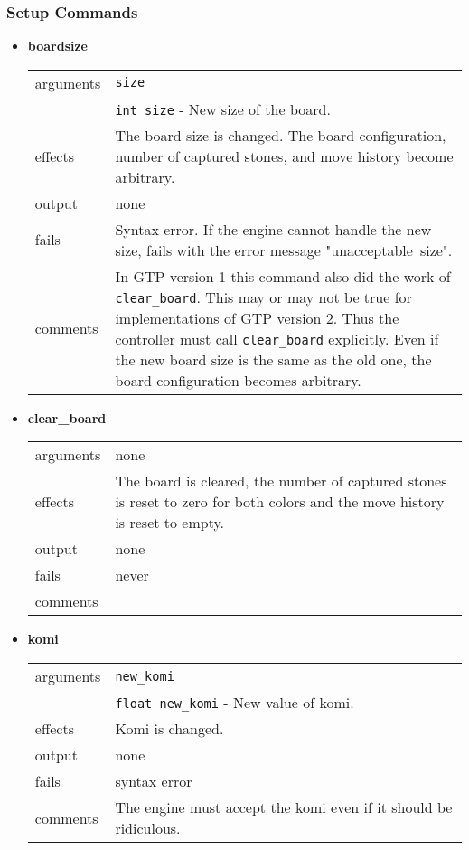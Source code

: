 \documentclass[a4paper]{article}
\begin{document}
\subsubsection{Setup Commands}
\begin{itemize}
\item \textbf{boardsize} \\
  \begin{tabularx}{\linewidth}{lX}
    arguments & \texttt{size} \\
    & \texttt{int size} - New size of the board. \\
    effects &   The board size is changed.
                The board configuration, number of captured stones, and move
                history become arbitrary. \\
    output &    none \\
    fails &     Syntax error. If the engine cannot handle the new
                size, fails with the error message
                "unacceptable~size". \\
    comments &  In GTP version 1 this command also did the work of
                \texttt{clear\_board}. This may or may not be true for
                implementations of GTP version 2. Thus the controller must
                call \texttt{clear\_board} explicitly.
                Even if the new board size is the same as the old one,
                the board configuration becomes arbitrary.\\
  \end{tabularx}

\item \textbf{clear\_board} \\
  \begin{tabularx}{\linewidth}{lX}
    arguments & none \\
    effects &   The board is cleared, the number of captured stones is
                reset to zero for both colors and the move history is reset
                to empty. \\
    output &    none \\
    fails &     never \\
    comments & 
  \end{tabularx}

\item \textbf{komi} \\
  \begin{tabularx}{\linewidth}{lX}
    arguments & \texttt{new\_komi} \\
    & \texttt{float new\_komi} - New value of komi. \\
    effects &   Komi is changed. \\
    output &    none \\
    fails &     syntax error \\
    comments &  The engine must accept the komi even if it should be
                ridiculous. \\
  \end{tabularx}


\end{itemize}
\end{document}
